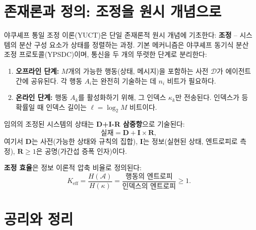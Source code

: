 \documentclass[12pt,a4paper]{article}
\newcommand{\Keff}{K_{\mathrm{eff}}}
\begin{document}
	\section{존재론과 정의: 조정을 원시 개념으로}
	\label{sec:ontology}
	
	야쿠셰프 통일 조정 이론(YUCT)은 단일 존재론적 원시 개념에 기초한다: \textbf{조정} – 시스템의 분산 구성 요소가 상태를 정렬하는 과정. 기본 메커니즘은 야쿠셰프 동기식 분산 조정 프로토콜(YPSDC)이며, 통신을 두 개의 뚜렷한 단계로 분리한다:
	\begin{enumerate}
		\item \textbf{오프라인 단계:} \(M\)개의 가능한 행동(상태, 메시지)을 포함하는 사전 \(\mathcal{D}\)가 에이전트 간에 공유된다. 각 행동 \(A_i\)는 완전히 기술하는 데 \(n_i\) 비트가 필요하다.
		\item \textbf{온라인 단계:} 행동 \(A_k\)를 활성화하기 위해, 그 인덱스 \(\kappa_k\)만 전송된다. 인덱스가 등확률일 때 인덱스 길이는 \(\ell = \log_2 M\) 비트이다.
	\end{enumerate}
	
	임의의 조정된 시스템의 상태는 \textbf{D+I-R 삼중항}으로 기술된다:
	\[
	\text{실재} = \mathbf{D} + \mathbf{I} \times \mathbf{R},
	\]
	여기서 \(\mathbf{D}\)는 사전(가능한 상태와 규칙의 집합), \(\mathbf{I}\)는 정보(실현된 상태, 엔트로피로 측정), \(\mathbf{R} \ge 1\)은 공명(가간섭 증폭 인자)이다.
	
	\textbf{조정 효율}은 정보 이론적 압축 비율로 정의된다:
	\begin{equation}
		\Keff = \frac{H(\mathcal{A})}{H(\kappa)} = \frac{\text{행동의 엔트로피}}{\text{인덱스의 엔트로피}} \ge 1.
		\label{eq:keff-def}
	\end{equation}
	
	\begin{center}
	\end{center}
	
	\section{공리와 정리}
	\label{sec:axioms}
	
\end{document}
